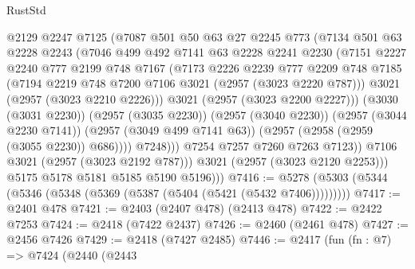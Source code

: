 \begin{lexlean}{RustStd}
\begin{coremodule}
                      @2129
                      @2247
                      @7125
                      (@7087
                        @501
                        @50
                        @63
                        @27
                        @2245
                        @773
                        (@7134
                          @501
                          @63
                          @2228
                          @2243
                          (@7046
                            @499
                            @492
                            @7141
                            @63
                            @2228
                            @2241
                            @2230
                            (@7151
                              @2227
                              @2240
                              @777
                              @2199
                              @748
                              @7167
                              (@7173
                                @2226
                                @2239
                                @777
                                @2209
                                @748
                                @7185
                                (@7194 @2219 @748 @7200 @7106 @3021 (@2957 (@3023 @2220 @787)))
                                @3021
                                (@2957 (@3023 @2210 @2226)))
                              @3021
                              (@2957 (@3023 @2200 @2227)))
                            (@3030 (@3031 @2230))
                            (@2957 (@3035 @2230))
                            (@2957 (@3040 @2230))
                            (@2957 (@3044 @2230 @7141))
                            (@2957 (@3049 @499 @7141 @63))
                            (@2957 (@2958 (@2959 (@3055 @2230)) @686))))
                        @7248)))
                  @7254
                  @7257
                  @7260
                  @7263
                  @7123))
              @7106
              @3021
              (@2957 (@3023 @2192 @787)))
            @3021
            (@2957 (@3023 @2120 @2253)))
          @5175
          @5178
          @5181
          @5185
          @5190
          @5196)))
@7416 := @5278 (@5303 (@5344 (@5346 (@5348 (@5369 (@5387 (@5404 (@5421 (@5432 @7406)))))))))
@7417 := @2401 @478
@7421 := @2403 (@2407 @478) (@2413 @478)
@7422 := @2422 @7253
@7424 := @2418 (@7422 @2437)
@7426 := @2460 (@2461 @478)
@7427 := @2456 @7426
@7429 := @2418 (@7427 @2485)
@7446 := @2417
    (fun (fn : @7) =>
    @7424
      (@2440
        (@2443

\end{coremodule}
\end{lexlean}
